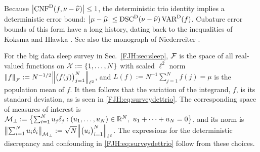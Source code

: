 \documentclass[graybox,footinfo]{svmult}
\begin{document}
Because $\bigl \lvert \textup{CNF}^{\textup{D}}(f,\nu - \widehat{\nu}) \bigr \rvert \le 1$, the deterministic trio 
identity implies a deterministic error bound:  $\bigl \lvert \mu - \widehat{\mu} \bigr \rvert  \le \textup{DSC}^{\textup{D}}(\nu - \widehat{\nu}) 
\, \textup{VAR}^{\textup{D}}(f)$.  
Cubature error bounds of this form have a long history, dating back to the inequalities of 
Koksma \cite{Kok42} and Hlawka \cite{Hla61}. See also the monograph of Niederreiter 
\cite{Nie92}.

For the big data sleep survey in Sec.\ \ref{FJH:sec:sleep}, ${\mathcal{F}}$ is the space of all 
real-valued functions on ${\mathcal{X}} := \{1, \ldots, N\}$ with scaled $\ell^2$ norm 
$\left \lVert f \right \rVert_{{\mathcal{F}}} 
:= N^{-1/2} \Bigl \lVert \bigl(f(j)\bigr)_{j=1}^N \Bigr \rVert_{\ell^2}$, and $L(f) := N^{-1}\sum_{j=1}^N f(j) 
= 
\mu $ is the population mean of $f$. It then follows that the variation of 
the integrand, $f$, is its standard deviation, as is seen in \eqref{FJH:eq:surveydettrio}.
The corresponding space of measures of interest is ${\mathcal{M}}_\bot := \bigl \{ \sum_{i=1}^N 
u_j 
\delta_{j} : (u_1, \ldots, u_N) \in {\mathbb{R}}^N,\ u_1 + \cdots + u_N= 0 \bigr \}$, and its norm is 
$\bigl \lVert \sum_{i=1}^N u_i \delta_{i} \bigr \rVert_{{\mathcal{M}}_\bot} : = 
	\sqrt{N} \Bigl \lVert \bigl(u_i\bigr)_{i=1}^N \Bigr \rVert_{\ell^2}$.   The expressions for the 
	deterministic 
	discrepancy and confounding in \eqref{FJH:eq:surveydettrio} follow from these 
	choices.
\end{document}
